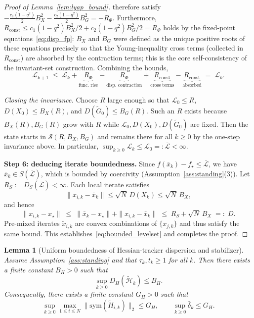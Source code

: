 \documentclass[11pt,a4paper]{article}
\newtheorem{lemma}[theorem]{Lemma}
\begin{document}
\begin{proof}[Proof of Lemma~\ref{lem:lyap_bound}]
therefore satisfy
$-\tfrac{c_1(1{-}q^2)}{2}B_X^2-\tfrac{c_2(1{-}q^2)}{2}B_G^2
=-R_\Phi$.
Furthermore, $R_{\mathrm{const}}\le c_1(1{-}q^2)B_X^2/2+c_2(1{-}q^2)B_G^2/2=R_\Phi$
holds by the fixed-point equations~\eqref{eq:disp_fp}:
$B_X$ and $B_G$ were defined as the unique positive roots of these
equations precisely so that the Young-inequality cross terms (collected
in $R_{\mathrm{const}}$) are absorbed by the contraction terms;
this is the core self-consistency of the invariant-set construction.
Combining the bounds,
\[
  \mathcal L_{k+1}
  \;\le\;
  \mathcal L_k
  +\underbrace{R_\Phi}_{\text{func.\ rise}}
  -\underbrace{R_\Phi}_{\text{disp.\ contraction}}
  +\underbrace{R_{\mathrm{const}}}_{\text{cross terms}}
  -\underbrace{R_{\mathrm{const}}}_{\text{absorbed}}
  \;=\; \mathcal L_k.
\]

\emph{Closing the invariance.}
Choose $R$ large enough so that
$\mathcal L_0\le R$,
$D(X_0)\le B_X(R)$, and
$D(\tilde G_0)\le B_G(R)$.
Such an $R$ exists because $B_X(R),B_G(R)$ grow with $R$
while $\mathcal L_0,D(X_0),D(\tilde G_0)$ are fixed.
Then the state starts in $\mathcal S(R,B_X,B_G)$
and remains there for all $k\ge0$ by the one-step invariance above.
In particular, $\sup_{k\ge0}\mathcal L_k\le \mathcal L_0=:\bar{\mathcal L}<\infty$.

\smallskip
\noindent\textbf{Step 6: deducing iterate boundedness.}
Since $f(\bar x_k)-f_\star\le\bar{\mathcal L}$, we have
$\bar x_k\in S(\bar{\mathcal L})$,
which is bounded by coercivity (Assumption~\ref{ass:standing}(3)).
Let $R_S:=D_S(\bar{\mathcal L})<\infty$.
Each local iterate satisfies
\[
  \|x_{i,k}-\bar x_k\|\le\sqrt{N}\,D(X_k)\le\sqrt{N}\,B_X,
\]
and hence
\[
  \|x_{i,k}-x_\star\|
  \;\le\;
  \|\bar x_k-x_\star\|+\|x_{i,k}-\bar x_k\|
  \;\le\;
  R_S + \sqrt{N}\,B_X
  \;=:\; D.
\]
Pre-mixed iterates $\tilde x_{i,k}$ are convex combinations of
$\{x_{j,k}\}$ and thus satisfy the same bound.
This establishes~\eqref{eq:bounded_levelset} and completes the proof.
\end{proof}

\begin{lemma}[Uniform boundedness of Hessian-tracker dispersion and stabilizer]\label{lem:tilde_hess_bounded}
Assume Assumption~\ref{ass:standing} and that $\tau_k,t_k\ge 1$ for all $k$.
Then there exists a finite constant $B_H>0$ such that
\[
\sup_{k\ge 0} D_H(\tilde{\mathcal H}_k)\le B_H.
\]
Consequently, there exists a finite constant $G_H>0$ such that
\[
\sup_{k\ge 0}\max_{1\le i\le N}\big\|\mathrm{sym}(\tilde H_{i,k})\big\|_2 \le G_H,
\qquad
\sup_{k\ge 0}\bar\delta_k \le G_H.
\]
\end{lemma}
\end{document}
